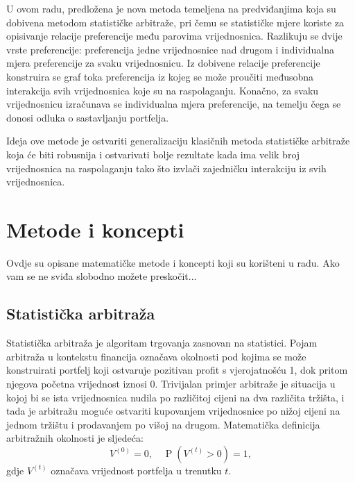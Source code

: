 \documentclass[lmodern, utf8, diplomski, numeric]{fer}
\newcommand{\prob}[1]{\operatorname{P}\left(#1\right)}
\begin{document}
  U ovom radu, predložena je nova metoda temeljena na predviđanjima koja su dobivena metodom statističke arbitraže, pri čemu se statističke mjere koriste za opisivanje relacije preferencije među parovima vrijednosnica.
  Razlikuju se dvije vrste preferencije: preferencija jedne vrijednosnice nad drugom i individualna mjera preferencije za svaku vrijednosnicu.
  Iz dobivene relacije preferencije konstruira se graf toka preferencija iz kojeg se može proučiti međusobna interakcija svih vrijednosnica koje su na raspolaganju.
  Konačno, za svaku vrijednosnicu izračunava se individualna mjera preferencije, na temelju čega se donosi odluka o sastavljanju portfelja.
  
  Ideja ove metode je ostvariti generalizaciju klasičnih metoda statističke arbitraže koja će biti robusnija i ostvarivati bolje rezultate kada ima velik broj vrijednosnica na raspolaganju tako što izvlači zajedničku interakciju iz svih vrijednosnica.

\chapter{Metode i koncepti}
  Ovdje su opisane matematičke metode i koncepti koji su korišteni u radu.
  Ako vam se ne sviđa slobodno možete preskočit...

  \section{Statistička arbitraža}
  Statistička arbitraža  je algoritam trgovanja zasnovan na statistici.
  Pojam arbitraža u kontekstu financija označava okolnosti pod kojima se može konstruirati portfelj koji ostvaruje pozitivan profit s vjerojatnošću 1, dok pritom njegova početna vrijednost iznosi 0.
  Trivijalan primjer arbitraže je situacija u kojoj bi se ista vrijednosnica nudila po različitoj cijeni na dva različita tržišta, i tada je arbitražu moguće ostvariti kupovanjem vrijednosnice po nižoj cijeni na jednom tržištu i prodavanjem po višoj na drugom.
  Matematička definicija arbitražnih okolnosti je sljedeća:
  \begin{equation}
  \label{eq:statarb}
  V^{(0)} = 0, \quad \prob{V^{\left(t\right)} > 0} = 1,
  \end{equation}
  gdje $V^{\left(t\right)}$ označava vrijednost portfelja u trenutku $t$.
\end{document}

